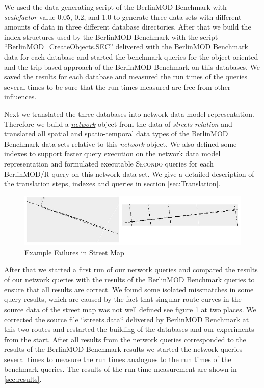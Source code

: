 \documentclass[a4paper]{article}
\newcommand{\secondo}{\textsc{Secondo}}
\newcommand{\bmodb} {BerlinMOD Benchmark}
\newcommand{\var}[1]{\textsl{#1}}
\newcommand{\dt}[1]{\textsl{\underline{#1}}}
\begin{document}
{We used the data generating script of the \bmodb{} with \var{scalefactor} value 0.05, 0.2, and 1.0 to generate three data sets with different amounts of data in three different database directories. After that we build the index structures used by the \bmodb{} with the script ``BerlinMOD\_CreateObjects.SEC'' delivered with the \bmodb{} data for each database and started the benchmark queries for the object oriented and the trip based approach of the \bmodb{} on this databases. We saved the results for each database and measured the run times of the queries several times to be sure that the run times measured are free from other influences.

Next we translated the three databases into network data model representation. Therefore we build a \dt{network} object from the data of \var{streets relation} and  translated all spatial and spatio-temporal data types of the \bmodb{} data sets relative to this \var{network} object. We also defined some indexes to support faster query execution on the network data model representation and formulated executable \secondo{} queries for each BerlinMOD/R query on this network data set. We give a detailed description of the translation steps, indexes and queries in section \ref{sec:Translation}.
\begin{figure}
\begin{center}
	\includegraphics[scale=1.0]{routefailure.eps}
	\caption{Example Failures in Street Map}
	\label{fig:routefailure}
	\end{center}
\end{figure}
After that we started a first run of our network queries and compared the results of our network queries with the results of the \bmodb{} queries to ensure that all results are correct. We found some isolated missmatches in some query results, which are caused by the fact that singular route curves in the source data of the street map was not well defined see figure \ref{fig:routefailure} at two places. We corrected the source file ``streets.data`` delivered by \bmodb{} at this two routes and restarted the building of the databases and our experiments from the start. After all results from the network queries corresponded to the results of the \bmodb{} results we started the network queries several times to measure the run times analogues to the run times of the benchmark queries. The results of the run time measurement are shown in \ref{sec:results}.
}
\end{document}
